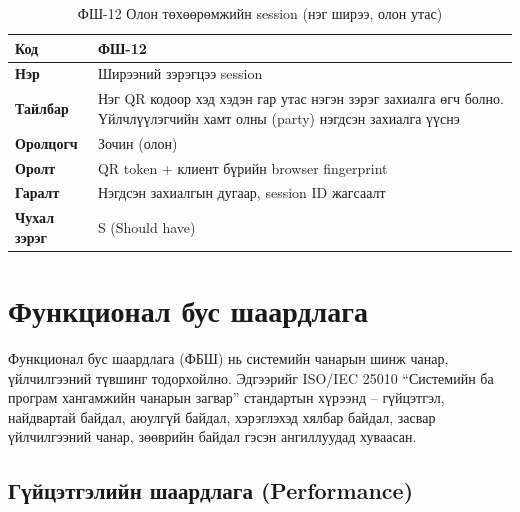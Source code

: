 \begin{table}[htbp]
\caption{ФШ-12 Олон төхөөрөмжийн session (нэг ширээ, олон утас)}
\label{tab:fr12}
\centering
\small
\begin{tabularx}{\textwidth}{|l|L|}
\hline
{}
\textbf{Код} & ФШ-12 \\ \hline
\textbf{Нэр} & Ширээний зэрэгцээ session \\ \hline
{}
\textbf{Тайлбар} & Нэг QR кодоор хэд хэдэн гар утас нэгэн зэрэг захиалга өгч болно. Үйлчлүүлэгчийн хамт олны (party) нэгдсэн захиалга үүснэ \\ \hline
\textbf{Оролцогч} & Зочин (олон) \\ \hline
{}
\textbf{Оролт} & QR token + клиент бүрийн browser fingerprint \\ \hline
\textbf{Гаралт} & Нэгдсэн захиалгын дугаар, session ID жагсаалт \\ \hline
{}
\textbf{Чухал зэрэг} & S (Should have) \\ \hline
\end{tabularx}
\end{table}

\section{Функционал бус шаардлага}

Функционал бус шаардлага (ФБШ) нь системийн чанарын шинж чанар, үйлчилгээний
түвшинг тодорхойлно. Эдгээрийг ISO/IEC 25010 ``Системийн ба програм хангамжийн
чанарын загвар'' стандартын хүрээнд -- гүйцэтгэл, найдвартай байдал, аюулгүй
байдал, хэрэглэхэд хялбар байдал, засвар үйлчилгээний чанар, зөөврийн байдал
гэсэн ангиллуудад хуваасан.

\subsection{Гүйцэтгэлийн шаардлага (Performance)}

